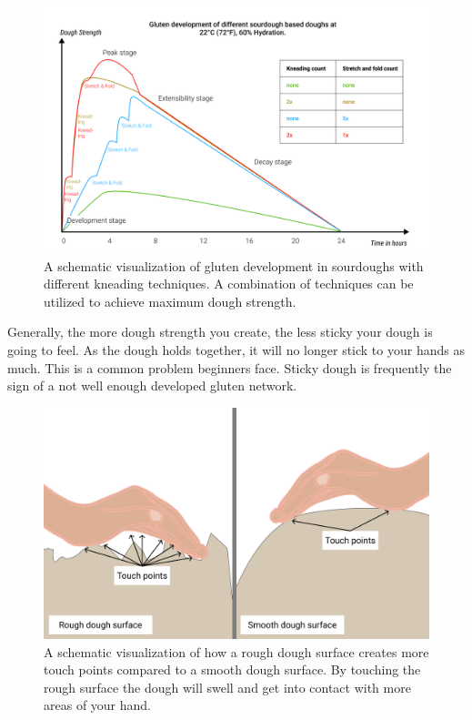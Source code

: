 \begin{figure}[!htb]
  \centering
  \includegraphics[width=\textwidth]{dough-strength-sourdough}
  \caption[Dough strength over time with kneading]{A schematic visualization
      of gluten development in sourdoughs with different kneading techniques.
      A combination of techniques can be utilized to achieve maximum dough
      strength.}%
  \label{fig:dough-strength-sourdough}
\end{figure}

Generally, the more dough strength you create, the less sticky your dough is going to
feel. As the dough holds together, it will no longer stick to your hands as
much. This is a common problem beginners face. Sticky dough is frequently
the sign of a not well enough developed gluten network.

\begin{figure}[!htb]
  \centering
  \includegraphics[width=\textwidth]{dough-surface-touchpoints}
  \caption[Touching the dough surface]{A schematic visualization of how a rough
      dough surface creates more touch points compared to a smooth dough
      surface.  By touching the rough surface the dough will swell and get into
      contact with more areas of your hand.}%
  \label{fig:dough-touch-points}
\end{figure}

